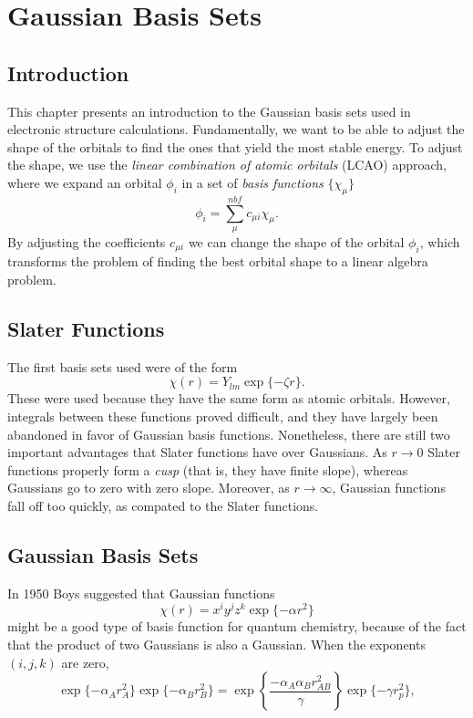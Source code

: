 \chapter{Gaussian Basis Sets}
\label{Basis_Chapter}

\section{Introduction}
This chapter presents an introduction to the Gaussian basis sets used
in electronic structure calculations. Fundamentally, we want to be
able to adjust the shape of the orbitals to find the ones that yield
the most stable energy. To adjust the shape, we use the
\emph{linear combination of atomic orbitals} (LCAO) approach, where we
expand an orbital $\phi_i$ in a set of 
\emph{basis functions} $\{\chi_\mu\}$
\begin{equation}
	\phi_i = \sum_\mu^{nbf} c_{\mu i} \chi_\mu.
\end{equation}
By adjusting the coefficients $c_{\mu i}$ we can change the shape of
the orbital $\phi_i$, which transforms the problem of finding the best
orbital shape to a linear algebra problem.

\section{Slater Functions}
The first basis sets used were of the form 
\begin{equation}
	\chi(r) = Y_{lm}\exp\{-\zeta r\}.
\end{equation}
These were used because they have the same form as atomic
orbitals. However, integrals between these functions proved
difficult, and they have largely been abandoned in favor of Gaussian
basis functions. Nonetheless, there are still two important advantages
that Slater functions have over Gaussians. As $r\rightarrow 0$ Slater
functions properly form a \emph{cusp} (that is, they have finite
slope), whereas Gaussians go to zero with zero slope. Moreover, as
$r\rightarrow \infty$, Gaussian functions fall off too quickly, as
compated to the Slater functions.

\section{Gaussian Basis Sets}
In 1950 Boys suggested that Gaussian functions
\begin{equation}
	\chi(r) = x^iy^jz^k\exp\{-\alpha r^2\}
\end{equation}
might be a good type of basis function for quantum chemistry, because
of the fact that the product of two Gaussians is also a Gaussian. When
the exponents $(i,j,k)$ are zero,
\begin{equation}
	\exp\{-\alpha_Ar_A^2\}\exp\{-\alpha_Br_B^2\} = 
	\exp\left\{\frac{-\alpha_A\alpha_Br_{AB}^2}{\gamma}\right\}
	\exp\{-\gamma r_p^2\},
\end{equation}

